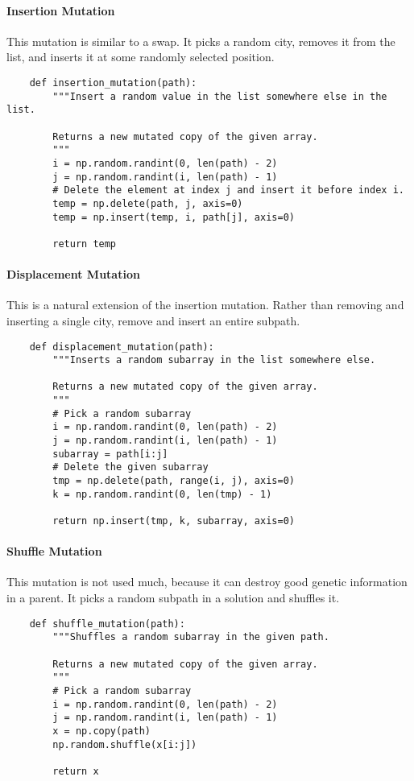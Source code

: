 \documentclass{article}
\begin{document}
\paragraph{Insertion Mutation} This mutation is similar to a swap. It picks a random city, removes
it from the list, and inserts it at some randomly selected position.
\begin{verbatim}
    def insertion_mutation(path):
        """Insert a random value in the list somewhere else in the list.

        Returns a new mutated copy of the given array.
        """
        i = np.random.randint(0, len(path) - 2)
        j = np.random.randint(i, len(path) - 1)
        # Delete the element at index j and insert it before index i.
        temp = np.delete(path, j, axis=0)
        temp = np.insert(temp, i, path[j], axis=0)

        return temp
\end{verbatim}

\paragraph{Displacement Mutation} This is a natural extension of the insertion mutation. Rather
than removing and inserting a single city, remove and insert an entire subpath.
\begin{verbatim}
    def displacement_mutation(path):
        """Inserts a random subarray in the list somewhere else.

        Returns a new mutated copy of the given array.
        """
        # Pick a random subarray
        i = np.random.randint(0, len(path) - 2)
        j = np.random.randint(i, len(path) - 1)
        subarray = path[i:j]
        # Delete the given subarray
        tmp = np.delete(path, range(i, j), axis=0)
        k = np.random.randint(0, len(tmp) - 1)

        return np.insert(tmp, k, subarray, axis=0)
\end{verbatim}

\paragraph{Shuffle Mutation} This mutation is not used much, because it can destroy good genetic
information in a parent. It picks a random subpath in a solution and shuffles it.
\begin{verbatim}
    def shuffle_mutation(path):
        """Shuffles a random subarray in the given path.

        Returns a new mutated copy of the given array.
        """
        # Pick a random subarray
        i = np.random.randint(0, len(path) - 2)
        j = np.random.randint(i, len(path) - 1)
        x = np.copy(path)
        np.random.shuffle(x[i:j])

        return x
\end{verbatim}
\end{document}
